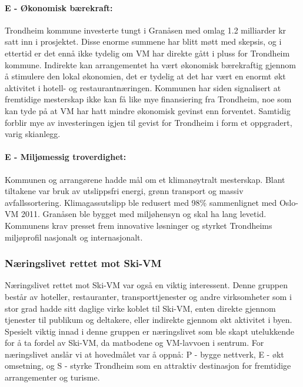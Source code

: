 \paragraph{E - Økonomisk bærekraft:} Trondheim kommune investerte tungt i Granåsen med omlag 1.2 
milliarder kr satt inn i prosjektet\cite{NRK12Milliarder}. Disse enorme summene har blitt møtt med skepsis,
og i ettertid er det ennå ikke tydelig om VM har direkte gått i pluss for Trondheim kommune\cite{AftenpostenNyVM}.
Indirekte kan arrangementet ha vært økonomisk bærekraftig gjennom å stimulere den lokal
økonomien, det er tydelig at det har vært en enormt økt aktivitet i hotell- og
restaurantnæringen\cite{DagbladetPriser}. Kommunen har siden signalisert at fremtidige mesterskap ikke
kan få like mye finansiering fra Trondheim\cite{NeaRadioVM}, noe som kan tyde på at VM har hatt mindre økonomisk
gevinst enn forventet. Samtidig forblir mye av investeringen igjen til gevist for Trondheim i form
et oppgradert, varig skianlegg.

\paragraph{E - Miljømessig troverdighet:} Kommunen og arrangørene hadde mål om et klimanøytralt 
mesterskap\cite{TrondheimKommuneVM}. Blant tiltakene var bruk av utslippsfri energi, grønn 
transport og massiv avfallssortering. Klimagassutslipp ble redusert med 98\% sammenlignet 
med Oslo-VM 2011\cite{Trondheim2025Kutt}. Granåsen ble bygget med miljøhensyn og skal ha lang levetid. 
Kommunens krav presset frem innovative løsninger og styrket Trondheims miljøprofil nasjonalt og internasjonalt.

\subsubsection{Næringslivet rettet mot Ski-VM}
Næringslivet rettet mot Ski-VM var også en viktig interessent. Denne gruppen består av 
hoteller, restauranter, transporttjenester og andre virksomheter som i stor grad hadde sitt 
daglige virke koblet til Ski-VM, enten direkte gjennom tjenester til publikum og deltakere, 
eller indirekte gjennom økt aktivitet i byen. Spesielt viktig innad i denne gruppen er 
næringslivet som ble skapt utelukkende for å ta fordel av Ski-VM, da matbodene og VM-lavvoen 
i sentrum. For næringslivet anslår vi at hovedmålet var å oppnå: P - bygge nettverk, E - økt omsetning,  og S - styrke Trondheim som en attraktiv destinasjon for fremtidige arrangementer og turisme.

